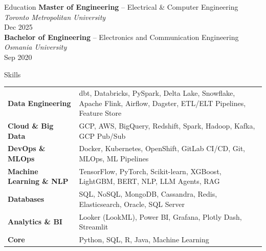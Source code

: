 \documentclass[25pt]{resume}
\begin{document}
\begin{ResumeSection}{Education}
    \textbf{Master of Engineering} -- Electrical \& Computer Engineering \hfill \textit{Toronto Metropolitan University} \\
    Dec 2025 \\
    \textbf{Bachelor of Engineering} -- Electronics and Communication Engineering \hfill \textit{Osmania University} \\
    Sep 2020
\end{ResumeSection}

\begin{ResumeSection}{Skills}
\begin{tabular*}{\textwidth}{@{\extracolsep{\fill}} l p{}}
\textbf{Data Engineering} & dbt, Databricks, PySpark, Delta Lake, Snowflake, Apache Flink, Airflow, Dagster, ETL/ELT Pipelines, Feature Store \\
\textbf{Cloud \& Big Data} & GCP, AWS, BigQuery, Redshift, Spark, Hadoop, Kafka, GCP Pub/Sub \\
\textbf{DevOps \& MLOps} & Docker, Kubernetes, OpenShift, GitLab CI/CD, Git, MLOps, ML Pipelines \\
\textbf{Machine Learning \& NLP} & TensorFlow, PyTorch, Scikit-learn, XGBoost, LightGBM, BERT, NLP, LLM Agents, RAG \\
\textbf{Databases} & SQL, NoSQL, MongoDB, Cassandra, Redis, Elasticsearch, Oracle, SQL Server \\
\textbf{Analytics \& BI} & Looker (LookML), Power BI, Grafana, Plotly Dash, Streamlit \\
\textbf{Core} & Python, SQL, R, Java, Machine Learning \\
\end{tabular*}
\end{ResumeSection}
\end{document}
